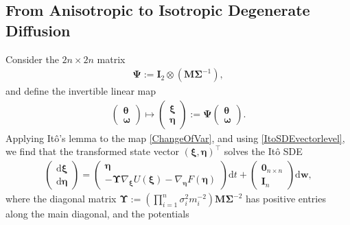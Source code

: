 \documentclass[10pt,twocolumn]{IEEEtran}
\begin{document}
\subsection{From Anisotropic to Isotropic Degenerate Diffusion}\label{subsec:FromAnisoToIso}
Consider the $2n\times 2n$ matrix
\begin{align}
\bm{\Psi}:= \bm{I}_{2} \otimes \left(\bm{M}\bm{\Sigma}^{-1}\right), \label{DefPsi}	
\end{align}
and define the invertible linear map
\begin{align}
\begin{pmatrix}
\bm{\theta}\\
\bm{\omega}	
\end{pmatrix} \mapsto \begin{pmatrix}
\bm{\xi}\\
\bm{\eta}	
\end{pmatrix} := \bm{\Psi} \begin{pmatrix}
\bm{\theta}\\
\bm{\omega}	
\end{pmatrix}. \label{ChangeOfVar}
\end{align}
Applying It\^{o}'s lemma \cite[Ch. 4.2]{oksendal2013stochastic} to the map \eqref{ChangeOfVar}, and using \eqref{ItoSDEvectorlevel}, we find that the transformed state vector $(\bm{\xi},\bm{\eta})^{\top}$ solves the It\^{o} SDE 
\begin{align}
\begin{pmatrix}
{\mathrm{d}}\bm{\xi}\\
{\mathrm{d}}\bm{\eta}	
\end{pmatrix}
\! = \!\begin{pmatrix}\!
\bm{\eta}\\
-\bm{\Upsilon}\nabla_{\bm{\xi}}U(\bm{\xi}) -\nabla_{\bm{\eta}}F\left(\bm{\eta}\right)  	
\!\end{pmatrix}\!{\mathrm{d}}t + \!\begin{pmatrix}\!
 \bm{0}_{n\times n}\\
 \bm{I}_{n}	
 \!\end{pmatrix}\!{\mathrm{d}}\bm{w},
\label{XiEtaVectorSDE}	
\end{align}
where the diagonal matrix $\bm{\Upsilon}:= \left(\prod_{i=1}^{n}\sigma_{i}^{2}m_{i}^{-2}\right)\bm{M\Sigma}^{-2}$ has positive entries along the main diagonal, and the potentials
\end{document}
